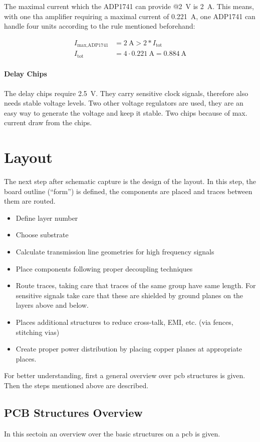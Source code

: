 The maximal current which the ADP1741 can provide @\SI{2}{\volt} is \SI{2}{\ampere}.
This means, with one \gls{tha} amplifier requiring a maximal current of \SI{0.221}{\ampere}, one ADP1741 can handle four units according to the rule mentioned beforehand:

\begin{align}
I_\text{max,ADP1741} &= \SI{2}{\ampere} > 2 * I_\text{tot}\\
I_\text{tot} &= 4 \cdot \SI{0.221}{\ampere} =  \SI{0.884}{\ampere}
\end{align}

\paragraph{Delay Chips}
The delay chips require \SI{2.5}{\volt}. They carry sensitive clock signals, therefore also needs stable voltage levels. 
Two other voltage regulators are used, they are an easy way to generate the voltage and keep it stable.
Two chips because of max. current draw from the chips.

\section{Layout}
The next step after schematic capture is the design of the layout.
In this step, the board outline (``form'') is defined, the components are placed and traces between them are routed.
\begin{itemize}
\item Define layer number
\item Choose substrate 
\item Calculate transmission line geometries for high frequency signals
\item Place components following proper decoupling techniques
\item Route traces, taking care that traces of the same group have same length. For sensitive signals take care that these are shielded by ground planes on the layers above and below.
\item Places additional structures to reduce cross-talk, EMI, etc. (via fences, stitching vias)
\item Create proper power distribution by placing copper planes at appropriate places.
\end{itemize}

For better understanding, first a general overview over \gls{pcb} structures is given. 
Then the steps mentioned above are described.
\subsection{PCB Structures Overview} \label{ssec:pcb_structs}
In this sectoin an overview over the basic structures on a \gls{pcb} is given.

